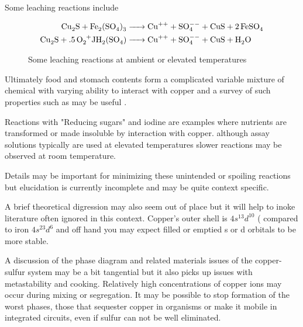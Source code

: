Some leaching reactions include 
\cite{Schlesinger_King_Sole_Hydrometallurgical_Copper_Extraction_2011}


\begin{figure}[ht]
\begin{align}
\cee{Cu_{2}S +Fe_2(SO_4)_3  & -> Cu^{++} + SO^{--}_4 + CuS + 2FeSO_4  } \\
\cee{Cu_{2}S +.5O_2+JH_2(SO_4)  & -> Cu^{++} + SO^{--}_4 + CuS + H_2O  } \\
\end{align}
\caption{ \label{fig:leachers} Some leaching reactions
\cite{Schlesinger_King_Sole_Hydrometallurgical_Copper_Extraction_2011}
 at ambient or elevated temperatures  }
\end{figure}

Ultimately food and stomach contents form a complicated variable
mixture of chemical with varying ability to interact with copper
and a survey of such properties such as 
\cite{Manceau_Matynia_nature_2010} may be useful .



Reactions with "Reducing sugars"
and iodine are examples where nutrients are transformed
or made insoluble by interaction with copper. although
assay solutions typically are used at elevated temperatures
slower reactions may be observed at room temperature.

Details may be important for minimizing these unintended
or spoiling reactions but elucidation is currently incomplete
and may be quite context specific. 


A brief theoretical digression may also seem out of place
but it will help to inoke literature often ignored in this
context. 
Copper's outer shell is $4s^13d^{10}$
( compared to iron $4s^23d^6$
and off hand you may expect filled or emptied s or d orbitals
to be more stable. 
 

A discussion of the phase diagram and related materials
issues of the copper-sulfur system may be a bit tangential
but it also picks up issues with metastability and cooking.
Relatively high concentrations of copper ions may occur during
mixing or segregation.
It may be possible to stop formation of the worst phases,
those that sequester copper in organisms or make it
mobile in integrated circuits, even if sulfur can not
be well eliminated. 

